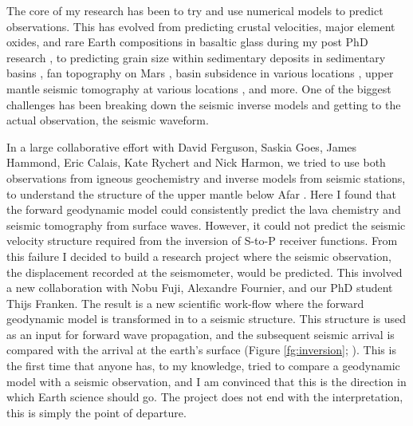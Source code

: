 The core of my research has been to try and use numerical models to predict observations. This has evolved from predicting crustal velocities, major element oxides, and rare Earth compositions in basaltic glass during my post PhD research \citep{armitage-etal-2010,armitage-etal-g3-2011}, to predicting grain size within sedimentary deposits in sedimentary basins \citep[e.g.][]{armitage-etal-ngeo-2011,armitage-etal-2015,armitage-etal-br-2018}, fan topography on Mars \citep{armitage-etal-grl-2011}, basin subsidence in various locations \citep[e.g.][]{armitage-2010,armitage-etal-jgr-2013,petersen-etal-2015}, upper mantle seismic tomography at various locations \citep[e.g.][]{goes-etal-2012,armitage-etal-2015}, and more. One of the biggest challenges has been breaking down the seismic inverse models and getting to the actual observation, the seismic waveform.

In a large collaborative effort with David Ferguson, Saskia Goes, James Hammond, Eric Calais, Kate Rychert and Nick Harmon, we tried to use both observations from igneous geochemistry and inverse models from seismic stations, to understand the structure of the upper mantle below Afar \citep{armitage-etal-epsl-2015}. Here I found that the forward geodynamic model could consistently predict the lava chemistry and seismic tomography from surface waves. However, it could not predict the seismic velocity structure required from the inversion of S-to-P receiver functions. From this failure I decided to build a research project where the seismic observation, the displacement recorded at the seismometer, would be predicted. This involved a new collaboration with Nobu Fuji, Alexandre Fournier, and our PhD student Thijs Franken. The result is a new scientific work-flow where the forward geodynamic model is transformed in to a seismic structure. This structure is used as an input for forward wave propagation, and the subsequent seismic arrival is compared with the arrival at the earth's surface (Figure \ref{fg:inversion}; \citealp{franken-etal-2020}). This is the first time that anyone has, to my knowledge, tried to compare a geodynamic model with a seismic observation, and I am convinced that this is the direction in which Earth science should go. The project does not end with the interpretation, this is simply the point of departure.

